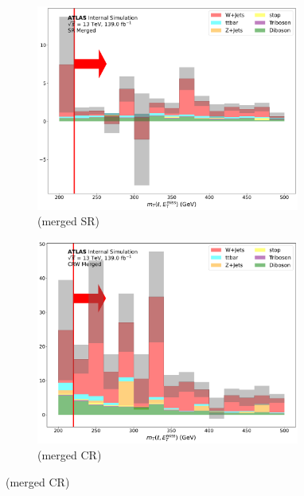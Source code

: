 \begin{figure}[htbp]
  \centering
     \begin{subfigure}{0.45\textwidth}
     \includegraphics[width = 0.95\textwidth]{Figures/App_SR_CR_distributions/SR1L_Merged/mT_lep_met_N_1.pdf}
    \caption{\mtlepmet (merged SR)}
     \end{subfigure}
    \begin{subfigure}{0.45\textwidth}
     \includegraphics[width = 0.95\textwidth]{Figures/App_SR_CR_distributions/CRW_Merged/mT_lep_met_N_1.pdf}
     \caption{\mtlepmet (merged \wjets CR)}
     \end{subfigure}


\end{figure}
